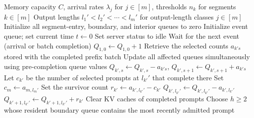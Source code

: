 \begin{breakablealgorithm}
\caption{Full Event-Driven Implementation of Nested WAIT}
\label{alg:nested_wait_full}
{\footnotesize\linespread{0.98}\selectfont
\begin{algorithmic}[1]
\Require Memory capacity \( C \), arrival rates \( \lambda_j \) for \( j \in [m] \), thresholds \( n_k \) for segments \( k \in [m] \)
\Require Output lengths \( l_1' < l_2' < \cdots < l_m' \) for output-length classes \( j \in [m] \)
    \Statex {}
    \Statex {}
    \Statex {}
    \State Initialize all segment-entry, boundary, and interior queues to zero
    \State Initialize event queue; set current time \( t \gets 0 \)
    \State Set server status to idle
        \State Wait for the next event (arrival or batch completion)
            \State \( Q_{1,0} \gets Q_{1,0} + 1 \)  
            \State Retrieve the selected counts \(a_{k's}\) stored with the completed prefix batch
            \State Update all affected queues simultaneously using pre-completion queue values
                    \State \(Q_{k',s}\gets Q_{k',s}-a_{k's}\), \quad \(Q_{k',s+1}\gets Q_{k',s+1}+a_{k's}\)
                \EndFor
                    \State Let \(c_{k'}\) be the number of selected prompts at \(l_{k'}'\) that complete there
                \Else
                    \State Set \(c_m\gets a_{m,l_m'}\)
                \EndIf
                \State Set the survivor count \(r_{k'}\gets a_{k',l_{k'}'}-c_{k'}\)
                \State \(Q_{k',l_{k'}'}\gets Q_{k',l_{k'}'}-a_{k',l_{k'}'}\)
                    \State \(Q_{k'+1,l_{k'}'}\gets Q_{k'+1,l_{k'}'}+r_{k'}\) 
                \Else
                    \State Clear KV caches of completed prompts
                \EndIf
            \EndFor
                \State Choose \(h\ge2\) whose resident boundary queue contains the most recently admitted prompt

\end{algorithmic}}
\end{breakablealgorithm}
